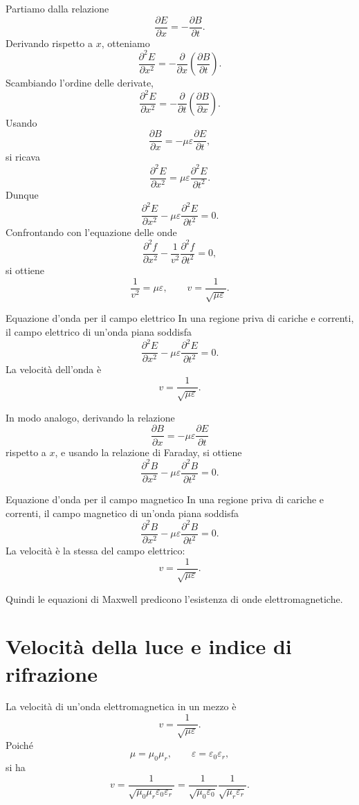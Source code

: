 \documentclass[a4paper]{article}
\begin{document}
Partiamo dalla relazione
\[
\frac{\partial E}{\partial x}=-\frac{\partial B}{\partial t}.
\]
Derivando rispetto a \(x\), otteniamo
\[
\frac{\partial^2E}{\partial x^2}=-\frac{\partial}{\partial x}\left(\frac{\partial B}{\partial t}\right).
\]
Scambiando l'ordine delle derivate,
\[
\frac{\partial^2E}{\partial x^2}=-\frac{\partial}{\partial t}\left(\frac{\partial B}{\partial x}\right).
\]
Usando
\[
\frac{\partial B}{\partial x}=-\mu\varepsilon\frac{\partial E}{\partial t},
\]
si ricava
\[
\frac{\partial^2E}{\partial x^2}=\mu\varepsilon\frac{\partial^2E}{\partial t^2}.
\]
Dunque
\[
\frac{\partial^2E}{\partial x^2}-\mu\varepsilon\frac{\partial^2E}{\partial t^2}=0.
\]
Confrontando con l'equazione delle onde
\[
\frac{\partial^2f}{\partial x^2}-\frac{1}{v^2}\frac{\partial^2f}{\partial t^2}=0,
\]
si ottiene
\[
\frac{1}{v^2}=\mu\varepsilon,
\qquad
v=\frac{1}{\sqrt{\mu\varepsilon}}.
\]

\begin{snippettheorem}{Equazione d'onda per il campo elettrico}
In una regione priva di cariche e correnti, il campo elettrico di un'onda piana soddisfa
\[
    \frac{\partial^2E}{\partial x^2}-\mu\varepsilon\frac{\partial^2E}{\partial t^2}=0.
\]
La velocità dell'onda è
\[
    v=\frac{1}{\sqrt{\mu\varepsilon}}.
\]
\end{snippettheorem}

In modo analogo, derivando la relazione
\[
\frac{\partial B}{\partial x}=-\mu\varepsilon\frac{\partial E}{\partial t}
\]
rispetto a \(x\), e usando la relazione di Faraday, si ottiene
\[
\frac{\partial^2B}{\partial x^2}-\mu\varepsilon\frac{\partial^2B}{\partial t^2}=0.
\]

\begin{snippettheorem}{Equazione d'onda per il campo magnetico}
In una regione priva di cariche e correnti, il campo magnetico di un'onda piana soddisfa
\[
    \frac{\partial^2B}{\partial x^2}-\mu\varepsilon\frac{\partial^2B}{\partial t^2}=0.
\]
La velocità è la stessa del campo elettrico:
\[
    v=\frac{1}{\sqrt{\mu\varepsilon}}.
\]
\end{snippettheorem}

Quindi le equazioni di Maxwell predicono l'esistenza di onde elettromagnetiche.

\section{Velocità della luce e indice di rifrazione}

La velocità di un'onda elettromagnetica in un mezzo è
\[
v=\frac{1}{\sqrt{\mu\varepsilon}}.
\]
Poiché
\[
\mu=\mu_0\mu_r,
\qquad
\varepsilon=\varepsilon_0\varepsilon_r,
\]
si ha
\[
v=\frac{1}{\sqrt{\mu_0\mu_r\varepsilon_0\varepsilon_r}}
=\frac{1}{\sqrt{\mu_0\varepsilon_0}}\frac{1}{\sqrt{\mu_r\varepsilon_r}}.
\]
\end{document}
